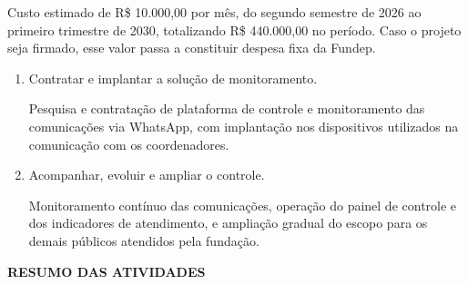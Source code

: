 \documentclass[12pt,a4paper]{article}
\newcommand{\secao}[1]{%
  \par\vspace{6pt}%
  {\noindent\bfseries\color{azulTitulo}\fontsize{13}{16}\selectfont #1}%
  \par\vspace{2pt}%
}
\begin{document}
Custo estimado de R\$ 10.000,00 por mês, do segundo semestre de 2026 ao primeiro trimestre de 2030, totalizando R\$ 440.000,00 no período. Caso o projeto seja firmado, esse valor passa a constituir despesa fixa da Fundep.

\begin{enumerate}
  \item Contratar e implantar a solução de monitoramento.

        Pesquisa e contratação de plataforma de controle e monitoramento das comunicações via WhatsApp, com implantação nos dispositivos utilizados na comunicação com os coordenadores.
  \item Acompanhar, evoluir e ampliar o controle.

        Monitoramento contínuo das comunicações, operação do painel de controle e dos indicadores de atendimento, e ampliação gradual do escopo para os demais públicos atendidos pela fundação.
\end{enumerate}

\secao{RESUMO DAS ATIVIDADES}
\end{document}
